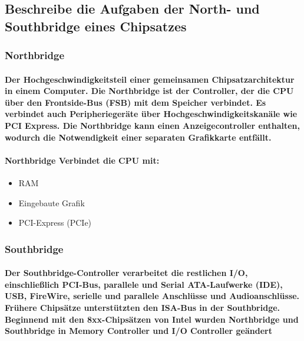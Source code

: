 \documentclass[a4paper]{article}
\begin{document}
    \subsection{\color{red}Beschreibe die Aufgaben der North- und Southbridge eines Chipsatzes}\label{subsec:beschreibe-die-aufgaben-der-north--und-southbridge-eines-chipsatzes}

    \subsubsection{\color{codegreen}Northbridge}

    \paragraph{\color{codegreen}Der Hochgeschwindigkeitsteil einer gemeinsamen Chipsatzarchitektur in einem Computer. Die Northbridge ist der Controller, der die CPU über den Frontside-Bus (FSB) mit dem Speicher verbindet. Es verbindet auch Peripheriegeräte über Hochgeschwindigkeitskanäle wie PCI Express. Die Northbridge kann einen Anzeigecontroller enthalten, wodurch die Notwendigkeit einer separaten Grafikkarte entfällt.}

    \paragraph{\color{red}Northbridge Verbindet die CPU mit:}
    \begin{itemize}
        \color{magenta}
        \item RAM
        \item Eingebaute Grafik
        \item PCI-Express (PCIe)
    \end{itemize}

    \subsubsection{\color{codegreen}Southbridge}

    \paragraph{\color{codegreen}Der Southbridge-Controller verarbeitet die restlichen I/O, einschließlich PCI-Bus, parallele und Serial ATA-Laufwerke (IDE), USB, FireWire, serielle und parallele Anschlüsse und Audioanschlüsse. Frühere Chipsätze unterstützten den ISA-Bus in der Southbridge. Beginnend mit den 8xx-Chipsätzen von Intel wurden Northbridge und Southbridge in Memory Controller und I/O Controller geändert}
\end{document}
